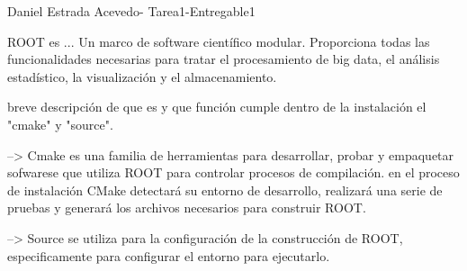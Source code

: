 Daniel Estrada Acevedo- Tarea1-Entregable1

 
ROOT es ...
Un marco de software científico modular. Proporciona todas las 
funcionalidades necesarias para tratar el procesamiento de big data,
el análisis estadístico, la visualización y el almacenamiento.


breve descripción de que es y que función cumple dentro de la 
instalación el "cmake" y "source".

--> Cmake es una familia de herramientas para desarrollar, probar 
y empaquetar sofwarese que utiliza ROOT para controlar procesos 
de compilación. en el proceso de instalación CMake detectará su 
entorno de desarrollo, realizará una serie de pruebas y generará 
los archivos necesarios para construir ROOT.

--> Source se utiliza para la configuración de la construcción de ROOT, 
especificamente para configurar el entorno para ejecutarlo.
